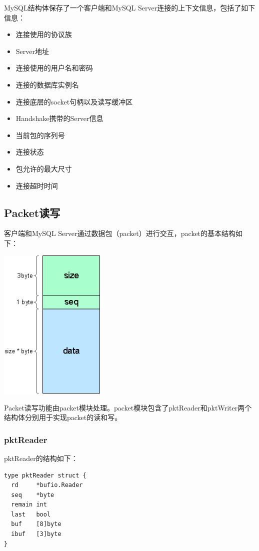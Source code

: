 \documentclass[a4paper, titlepage, 10pt, bookmark]{article}
\begin{document}
MySQL结构体保存了一个客户端和MySQL Server连接的上下文信息，包括了如下信息：
\begin{itemize}
    \item 连接使用的协议族
    \item Server地址
    \item 连接使用的用户名和密码
    \item 连接的数据库实例名
    \item 连接底层的socket句柄以及读写缓冲区
    \item Handshake携带的Server信息
    \item 当前包的序列号
    \item 连接状态
    \item 包允许的最大尺寸
    \item 连接超时时间
\end{itemize}



\subsection{Packet读写}
客户端和MySQL Server通过数据包（packet）进行交互，packet的基本结构如下：
\begin{center}
\includegraphics[width=2in]{017.png}
\end{center}

Packet读写功能由packet模块处理。packet模块包含了pktReader和pktWriter两个结构体分别用于实现packet的读和写。

\subsubsection{pktReader}
pktReader的结构如下：
\begin{spacing}{1.0}
\begin{lstlisting}
type pktReader struct {
  rd     *bufio.Reader
  seq    *byte
  remain int
  last   bool
  buf    [8]byte
  ibuf   [3]byte
}
\end{lstlisting}
\end{spacing}
\end{document}
